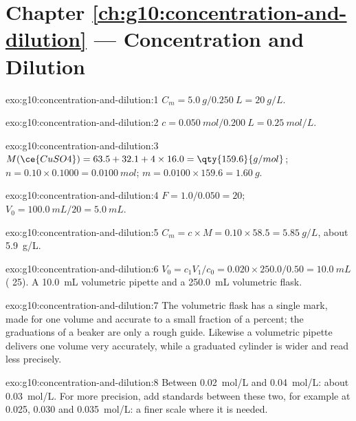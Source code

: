 \section*{Chapter \ref{ch:g10:concentration-and-dilution} --- Concentration and Dilution}

\begin{solution}{exo:g10:concentration-and-dilution:1}
$C_m = \qty{5.0}{g} / \qty{0.250}{L} = \qty{20}{g/L}$.
\end{solution}

\begin{solution}{exo:g10:concentration-and-dilution:2}
$c = \qty{0.050}{mol} / \qty{0.200}{L} = \qty{0.25}{mol/L}$.
\end{solution}

\begin{solution}{exo:g10:concentration-and-dilution:3}
$M(\ce{CuSO4}) = 63.5 + 32.1 + 4 \times 16.0 = \qty{159.6}{g/mol}$;
$n = 0.10 \times 0.1000 = \qty{0.0100}{mol}$; $m = 0.0100 \times 159.6 =
\qty{1.60}{g}$.
\end{solution}

\begin{solution}{exo:g10:concentration-and-dilution:4}
$F = 1.0 / 0.050 = 20$; $V_0 = \qty{100.0}{mL} / 20 = \qty{5.0}{mL}$.
\end{solution}

\begin{solution}{exo:g10:concentration-and-dilution:5}
$C_m = c \times M = 0.10 \times 58.5 = \qty{5.85}{g/L}$, about
\qty{5.9}{g/L}.
\end{solution}

\begin{solution}{exo:g10:concentration-and-dilution:6}
$V_0 = c_1 V_1 / c_0 = 0.020 \times 250.0 / 0.50 = \qty{10.0}{mL}$
( 25). A \qty{10.0}{mL} volumetric pipette and a
\qty{250.0}{mL} volumetric flask.
\end{solution}

\begin{solution}{exo:g10:concentration-and-dilution:7}
The volumetric flask has a single mark, made for one volume and
accurate to a small fraction of a percent; the graduations of a beaker
are only a rough guide. Likewise a volumetric pipette delivers one
volume very accurately, while a graduated cylinder is wider and read
less precisely.
\end{solution}

\begin{solution}{exo:g10:concentration-and-dilution:8}
Between \qty{0.02}{mol/L} and \qty{0.04}{mol/L}: about \qty{0.03}{mol/L}.
For more precision, add standards between these two, for example at
0.025, 0.030 and \qty{0.035}{mol/L}: a finer scale where it is needed.
\end{solution}

